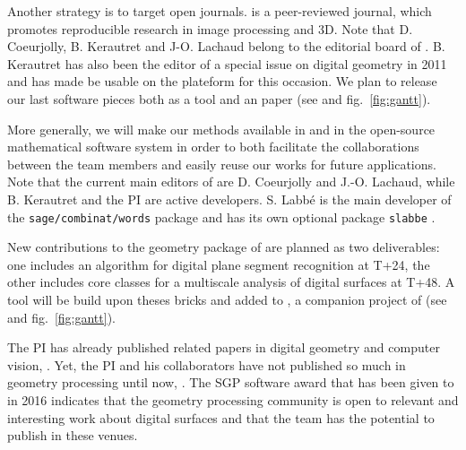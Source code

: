 Another strategy is to target open journals. {\IPOL} is a peer-reviewed journal, which promotes
reproducible research in image processing and 3D. Note that D. Coeurjolly, B. Kerautret and J-O. Lachaud
belong to the editorial board of {\IPOL}. B. Kerautret has also been the editor of a special issue on
digital geometry in 2011 and has made {\DGtal} be usable on the {\IPOL} plateform for this occasion. 
We plan to release our last software pieces both as a {\DGtal} tool and an {\IPOL} paper
(see  and fig.~\ref{fig:gantt}).

More generally, we will make our methods available in {\DGtal} 
and in the open-source mathematical software system {\sage}
in order to both facilitate the collaborations between the team members
and easily reuse our works for future applications.
Note that the current main editors of {\DGtal} are {D. Coeurjolly} and
{J.-O. Lachaud}, while {B. Kerautret} and the PI are active developers.
S. Labb\'{e} is the main developer of the \texttt{sage/combinat/words} package
and has its own optional package \texttt{slabbe}
\cite{labbe_slabbe_0_4_2018}.

New contributions to the geometry package of
{\DGtal} are planned as two deliverables: one includes an algorithm for
digital plane segment recognition at T+24, the other includes core classes
for a multiscale analysis of digital surfaces at T+48. A tool will be build
upon theses bricks and added to {\DGtalTools}, a companion project of
{\DGtal} (see  and fig.~\ref{fig:gantt}).  


The PI has already published related papers in digital geometry and computer vision,
\eg \cite{LPRTCS2016,LPRDGCI2016,LPRJMIV2017}. 
Yet, the PI and his collaborators have not published so much in geometry processing until now,
\eg \cite{Coeurjolly2017}.
The SGP software award that has been given to {\DGtal} in 2016 indicates that the
geometry processing community is open to relevant and interesting work about digital surfaces
and that the team has the potential to publish in these venues.


